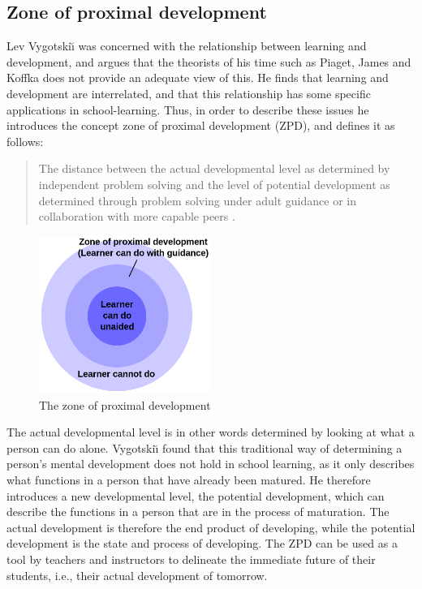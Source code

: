 \subsection{Zone of proximal development}
Lev Vygotski{\u\i} was concerned with the relationship between learning and development, and argues that the theorists of his time such as Piaget, James and Koffka does not provide an adequate view of this. He finds that learning and development are interrelated, and that this relationship has some specific applications in school-learning. \citep[p. 84]{vygotskiui1978mind} Thus, in order to describe these issues he introduces the concept zone of proximal development (ZPD), and defines it as follows:

\begin{quote}The distance between the actual developmental level as determined by independent problem solving and the level of potential development as determined through problem solving under adult guidance or in collaboration with more capable peers \citep[p. 86]{vygotskiui1978mind}.
\end{quote}

\begin{figure}
\centering
\includegraphics[width=0.5\textwidth]{img/theoretical/zpd.png}
\caption{The zone of proximal development \citep{wiki:zpd}}
\label{fig:zpd}
\end{figure}

The actual developmental level is in other words determined by looking at what a person can do alone. Vygotski{\u\i} found that this traditional way of determining a person's mental development does not hold in school learning, as it only describes what functions in a person that have already been matured. He therefore introduces a new developmental level, the potential development, which can describe the functions in a person that are in the process of maturation. The actual development is therefore the end product of developing, while the potential development is the state and process of developing. The ZPD can be used as a tool by teachers and instructors to delineate the immediate future of their students, i.e., their actual development of tomorrow.

